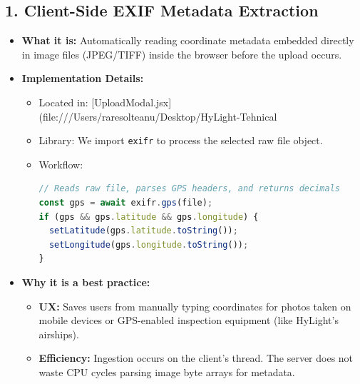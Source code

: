 \documentclass[11pt]{article}
\begin{document}
\subsection{1. Client-Side EXIF Metadata Extraction}
\begin{itemize}
    \item \textbf{What it is:} Automatically reading coordinate metadata embedded directly in image files (JPEG/TIFF) inside the browser before the upload occurs.
    \item \textbf{Implementation Details:}
      \begin{itemize}
        \item Located in: [UploadModal.jsx](file:///Users/raresolteanu/Desktop/HyLight-Tehnical%
        \item Library: We import \texttt{exifr} to process the selected raw file object.
        \item Workflow:
\begin{lstlisting}[language=JavaScript]
// Reads raw file, parses GPS headers, and returns decimals
const gps = await exifr.gps(file);
if (gps && gps.latitude && gps.longitude) {
  setLatitude(gps.latitude.toString());
  setLongitude(gps.longitude.toString());
}
\end{lstlisting}
      \end{itemize}
    \item \textbf{Why it is a best practice:}
      \begin{itemize}
        \item \textbf{UX:} Saves users from manually typing coordinates for photos taken on mobile devices or GPS-enabled inspection equipment (like HyLight's airships).
        \item \textbf{Efficiency:} Ingestion occurs on the client's thread. The server does not waste CPU cycles parsing image byte arrays for metadata.
      \end{itemize}
\end{itemize}
\end{document}
